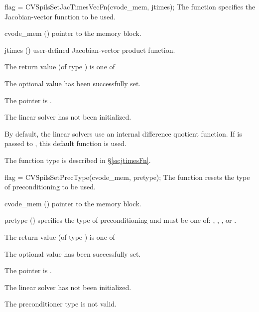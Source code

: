 {
  flag = CVSpilsSetJacTimesVecFn(cvode\_mem, jtimes);
}
{
  The function  specifies the Jacobian-vector 
  function to be used.
}
{
  \begin{args}
  \item[cvode\_mem] ()
    pointer to the {\cvode} memory block.
  \item[jtimes] ()
    user-defined Jacobian-vector product function.
  \end{args}
}
{
  The return value  (of type ) is one of
  \begin{args}
  \item[\Id{CVSPILS\_SUCCESS}] 
    The optional value has been successfully set.
  \item[\Id{CVSPILS\_MEM\_NULL}]
    The  pointer is .
  \item[\Id{CVSPILS\_LMEM\_NULL}]
    The {\cvspils} linear solver has not been initialized.
  \end{args}
}
{
  By default, the {\cvspils} linear solvers use an internal difference quotient function.
  If  is passed to , this default function is used.

  The function type  is described in \S\ref{ss:jtimesFn}.
}
{
  flag = CVSpilsSetPrecType(cvode\_mem, pretype);
}
{
  The function  resets the type
  of preconditioning to be used.
}
{
  \begin{args}
  \item[cvode\_mem] ()
    pointer to the {\cvode} memory block.
  \item[pretype] ()
    specifies the type of preconditioning and must be one of:
    , , , or .
  \end{args}
}
{
  The return value  (of type ) is one of
  \begin{args}
  \item[\Id{CVSPILS\_SUCCESS}] 
    The optional value has been successfully set.
  \item[\Id{CVSPILS\_MEM\_NULL}]
    The  pointer is .
  \item[\Id{CVSPILS\_LMEM\_NULL}]
    The {\cvspils} linear solver has not been initialized.
  \item[\Id{CVSPILS\_ILL\_INPUT}]
    The preconditioner type  is not valid.
  \end{args}
}
